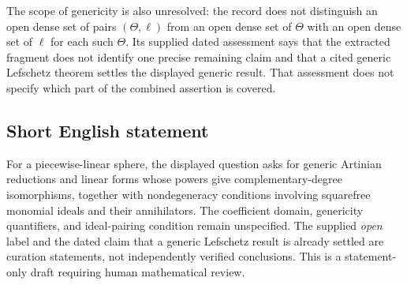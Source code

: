 \documentclass[11pt]{article}
\begin{document}
The scope of genericity is also unresolved: the record does not distinguish an open dense set of pairs \((\Theta,\ell)\) from an open dense set of \(\Theta\) with an open dense set of \(\ell\) for each such \(\Theta\). Its supplied dated assessment says that the extracted fragment does not identify one precise remaining claim and that a cited generic Lefschetz theorem settles the displayed generic result. That assessment does not specify which part of the combined assertion is covered.
\subsection{Short English statement}
For a piecewise-linear sphere, the displayed question asks for generic Artinian reductions and linear forms whose powers give complementary-degree isomorphisms, together with nondegeneracy conditions involving squarefree monomial ideals and their annihilators. The coefficient domain, genericity quantifiers, and ideal-pairing condition remain unspecified. The supplied \emph{open} label and the dated claim that a generic Lefschetz result is already settled are curation statements, not independently verified conclusions. This is a statement-only draft requiring human mathematical review.
\end{document}
